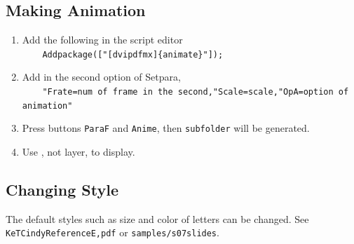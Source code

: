 \documentclass[papersize,a4paper,12pt]{article}
\begin{document}
\subsection{Making Animation}

\begin{enumerate}[1)]
\item Add the following in the script editor\\ 
\verb|    Addpackage(["[dvipdfmx]{animate}"]);|
\item Add in the second option of Setpara,\\
\verb|    "Frate=num of frame in the second,"Scale=scale,"OpA=option of animation" |
\item Press buttons \verb|ParaF| and \verb|Anime|, then \verb|subfolder| will be generated.
\item Use \verb||, not layer, to display.
\end{enumerate}

\subsection{Changing Style}

The default styles such as size and color of letters can be changed.
See \verb|KeTCindyReferenceE,pdf| or \verb|samples/s07slides|.
\end{document}
